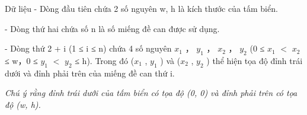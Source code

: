 Dữ liệu
- Dòng đầu tiên chứa 2 số nguyên w, h là kích thước của tấm biển.   


   - Dòng thứ hai chứa số n là số miếng đề can được sử dụng.   


   - Dòng thứ 2 + i (1 ≤ i ≤ n) chứa 4 số nguyên $x_{1}$   ， $y_{1}$   ， $x_{2}$   ， $y_{2}$   (0 ≤ $x_{1}$   $<$ $x_{2}$   ≤ w，0 ≤ $y_{1}$   $<$ $y_{2}$   ≤ h). Trong đó ($x_{1}$   , $y_{1}$   ) và ($x_{2}$   , $y_{2}$   ) thể hiện tọa độ đỉnh trái dưới và đỉnh phải trên của miếng đề can thứ i.   


\textit{     Chú ý rằng đỉnh trái dưới của tấm biển có tọa độ (0, 0) và đỉnh phải trên có tọa độ (w, h).    }